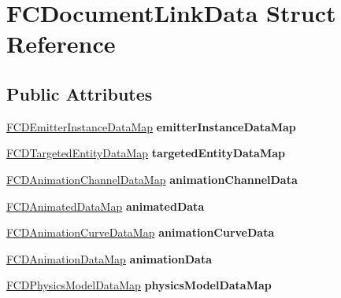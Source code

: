 \hypertarget{structFCDocumentLinkData}{
\section{FCDocumentLinkData Struct Reference}
\label{structFCDocumentLinkData}
}
\subsection*{Public Attributes}
\begin{DoxyCompactItemize}
\item 
\hypertarget{structFCDocumentLinkData_a0c3f1d31591d1baf07466c2a61e78af0}{
\hyperlink{classfm_1_1map}{FCDEmitterInstanceDataMap} {\bfseries emitterInstanceDataMap}}
\label{structFCDocumentLinkData_a0c3f1d31591d1baf07466c2a61e78af0}

\item 
\hypertarget{structFCDocumentLinkData_afd134c63b465ba4b405e7beec6dcea2d}{
\hyperlink{classfm_1_1map}{FCDTargetedEntityDataMap} {\bfseries targetedEntityDataMap}}
\label{structFCDocumentLinkData_afd134c63b465ba4b405e7beec6dcea2d}

\item 
\hypertarget{structFCDocumentLinkData_af96a0d773cd367b2be866c4c0f31bff1}{
\hyperlink{classfm_1_1map}{FCDAnimationChannelDataMap} {\bfseries animationChannelData}}
\label{structFCDocumentLinkData_af96a0d773cd367b2be866c4c0f31bff1}

\item 
\hypertarget{structFCDocumentLinkData_aa77c19a022a5df12ebfc6b9dd3666fb0}{
\hyperlink{classfm_1_1map}{FCDAnimatedDataMap} {\bfseries animatedData}}
\label{structFCDocumentLinkData_aa77c19a022a5df12ebfc6b9dd3666fb0}

\item 
\hypertarget{structFCDocumentLinkData_ae535f19bc363c009ccdf92179f0854cb}{
\hyperlink{classfm_1_1map}{FCDAnimationCurveDataMap} {\bfseries animationCurveData}}
\label{structFCDocumentLinkData_ae535f19bc363c009ccdf92179f0854cb}

\item 
\hypertarget{structFCDocumentLinkData_a9efd378db1a5e8c7c4e1c285d4e6059c}{
\hyperlink{classfm_1_1map}{FCDAnimationDataMap} {\bfseries animationData}}
\label{structFCDocumentLinkData_a9efd378db1a5e8c7c4e1c285d4e6059c}

\item 
\hypertarget{structFCDocumentLinkData_aaccd7c0f195aff0804cf48a0a7a7cfe8}{
\hyperlink{classfm_1_1map}{FCDPhysicsModelDataMap} {\bfseries physicsModelDataMap}}
\label{structFCDocumentLinkData_aaccd7c0f195aff0804cf48a0a7a7cfe8}


\end{DoxyCompactItemize}
